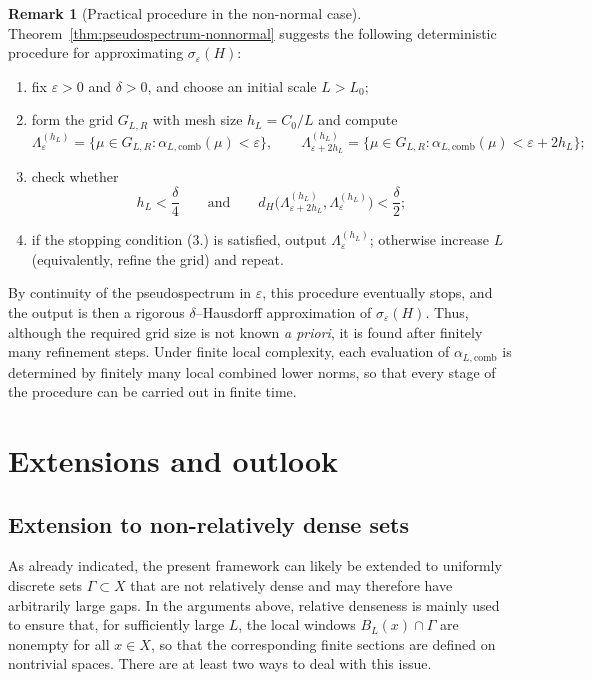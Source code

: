 \documentclass[11pt]{article}
\theoremstyle{definition}
\newtheorem{remark}[theorem]{Remark}
\begin{document}
\begin{remark}[Practical procedure in the non-normal case]
\label{rem:pseudo-sampling-procedure}
Theorem~\ref{thm:pseudospectrum-nonnormal} suggests the following deterministic
procedure for approximating $\sigma_\varepsilon(H)$:
\begin{enumerate}
\item fix $\varepsilon>0$ and $\delta>0$, and choose an initial scale $L>L_0$;
\item form the grid $G_{L,R}$ with mesh size $h_L=C_0/L$ and compute
\[
  \Lambda_\varepsilon^{(h_L)}
  =\{\mu\in G_{L,R}:\alpha_{L,\mathrm{comb}}(\mu) < \varepsilon\},
  \qquad
  \Lambda_{\varepsilon+2h_L}^{(h_L)}
  =\{\mu\in G_{L,R}:\alpha_{L,\mathrm{comb}}(\mu) < \varepsilon+2h_L\};
\]
\item check whether
\[
  h_L<\frac{\delta}{4}
  \qquad\text{and}\qquad
  d_H\bigl(\Lambda_{\varepsilon+2h_L}^{(h_L)},\Lambda_\varepsilon^{(h_L)}\bigr)
  <\frac{\delta}{2};
\]
\item if the stopping condition (3.) is satisfied, output $\Lambda_\varepsilon^{(h_L)}$;
otherwise increase $L$ (equivalently, refine the grid) and repeat.
\end{enumerate}
By continuity of the pseudospectrum in $\varepsilon$, this procedure eventually
stops, and the output is then a rigorous $\delta$--Hausdorff approximation of
$\sigma_\varepsilon(H)$. Thus, although the required grid size is not known
\emph{a priori}, it is found after finitely many refinement steps. Under finite local
complexity, each evaluation of $\alpha_{L,\mathrm{comb}}$ is determined by finitely
many local combined lower norms, so that every stage of the procedure can be carried
out in finite time.
\end{remark}


\section{Extensions and outlook}

\subsection{Extension to non-relatively dense sets}

As already indicated, the present framework can likely be extended to uniformly discrete sets
$\Gamma\subset X$ that are not relatively dense and may therefore have arbitrarily large gaps.
In the arguments above, relative denseness is mainly used to ensure that, for sufficiently large $L$,
the local windows $B_L(x)\cap\Gamma$ are nonempty for all $x\in X$, so that the corresponding
finite sections are defined on nontrivial spaces. There are at least two ways to deal with this issue.
\end{document}
